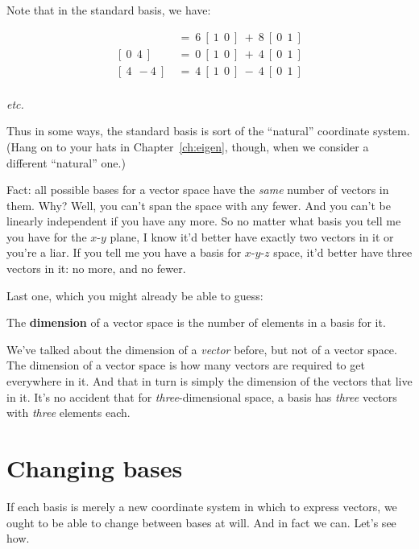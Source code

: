 \smallskip
Note that in the standard basis, we have:

\vspace{-.3in}
\begin{align*}
[\ 6 \ \ 8\ ]\ &=\ 6\ [\ 1 \ \ 0\ ] \ + \ 8\ [\ 0 \ \ 1\ ] \\
[\ 0 \ \ 4\ ]\ &=\ 0\ [\ 1 \ \ 0\ ] \ + \ 4\ [\ 0 \ \ 1\ ] \\
[\ 4 \ \ -4\ ]\ &=\ 4\ [\ 1 \ \ 0\ ] \ - \ 4\ [\ 0 \ \ 1\ ] \\
\end{align*}
\vspace{-.7in}
\begin{center}
\textit{etc.}
\end{center}

Thus in some ways, the standard basis is sort of the ``natural'' coordinate
system. (Hang on to your hats in Chapter~\ref{ch:eigen}, though, when we
consider a different ``natural'' one.)

Fact: all possible bases for a vector space have the \textit{same} number of
vectors in them. Why? Well, you can't span the space with any fewer. And you
can't be linearly independent if you have any more. So no matter what basis you
tell me you have for the $x$-$y$ plane, I know it'd better have exactly two
vectors in it or you're a liar. If you tell me you have a basis for 
$x$-$y$-$z$ space, it'd better have three vectors in it: no more, and no fewer.

\medskip

Last one, which you might already be able to guess:

\begin{framed}
The \textbf{dimension} of a vector space is the number of elements in a basis
for it.
\end{framed}

We've talked about the dimension of a \textit{vector} before, but not of a
vector space. The dimension of a vector space is how many vectors are required
to get everywhere in it. And that in turn is simply the dimension of the
vectors that live in it. It's no accident that for \textit{three}-dimensional
space, a basis has \textit{three} vectors with \textit{three} elements each.


\section{Changing bases}

If each basis is merely a new coordinate system in which to express vectors, we
ought to be able to change between bases at will. And in fact we can. Let's see
how.

